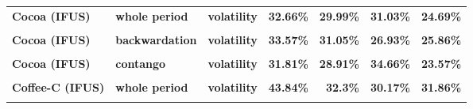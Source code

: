 \documentclass[
  authoryear,
  preprint,
  3p]{elsarticle}
\begin{document}
\begin{longtable}[t]{>{}l>{}l>{}l>{}r>{}r>{}r>{}r}
\addlinespace
\textbf{Cocoa (IFUS)} & \textbf{whole period} & \textbf{volatility} & \textcolor[HTML]{4285f4}{\textbf{32.66\%}} & \textcolor[HTML]{4285f4}{\textbf{29.99\%}} & \textcolor[HTML]{4285f4}{\textbf{31.03\%}} & \textcolor[HTML]{4285f4}{\textbf{24.69\%}}\\
\textbf{\cellcolor{gray!10}{Cocoa (IFUS)}} & \textbf{\cellcolor{gray!10}{backwardation}} & \textbf{\cellcolor{gray!10}{mean}} & \textcolor[HTML]{4285f4}{\textbf{\cellcolor{gray!10}{4.12\%}}} & \textcolor[HTML]{4285f4}{\textbf{\cellcolor{gray!10}{9.25\%}}} & \textcolor[HTML]{4285f4}{\textbf{\cellcolor{gray!10}{-9.56\%}}} & \textcolor[HTML]{4285f4}{\textbf{\cellcolor{gray!10}{-2.98\%}}}\\
\textbf{Cocoa (IFUS)} & \textbf{backwardation} & \textbf{volatility} & \textcolor[HTML]{4285f4}{\textbf{33.57\%}} & \textcolor[HTML]{4285f4}{\textbf{31.05\%}} & \textcolor[HTML]{4285f4}{\textbf{26.93\%}} & \textcolor[HTML]{4285f4}{\textbf{25.86\%}}\\
\textbf{\cellcolor{gray!10}{Cocoa (IFUS)}} & \textbf{\cellcolor{gray!10}{contango}} & \textbf{\cellcolor{gray!10}{mean}} & \textcolor[HTML]{4285f4}{\textbf{\cellcolor{gray!10}{3.67\%}}} & \textcolor[HTML]{4285f4}{\textbf{\cellcolor{gray!10}{23.43\%}}} & \textcolor[HTML]{4285f4}{\textbf{\cellcolor{gray!10}{12.92\%}}} & \textcolor[HTML]{4285f4}{\textbf{\cellcolor{gray!10}{10.29\%}}}\\
\textbf{Cocoa (IFUS)} & \textbf{contango} & \textbf{volatility} & \textcolor[HTML]{4285f4}{\textbf{31.81\%}} & \textcolor[HTML]{4285f4}{\textbf{28.91\%}} & \textcolor[HTML]{4285f4}{\textbf{34.66\%}} & \textcolor[HTML]{4285f4}{\textbf{23.57\%}}\\
\addlinespace
\textbf{\cellcolor{gray!10}{Coffee-C (IFUS)}} & \textbf{\cellcolor{gray!10}{whole period}} & \textbf{\cellcolor{gray!10}{mean}} & \textcolor[HTML]{4285f4}{\textbf{\cellcolor{gray!10}{-5.91\%}}} & \textcolor[HTML]{4285f4}{\textbf{\cellcolor{gray!10}{20.38\%}}} & \textcolor[HTML]{4285f4}{\textbf{\cellcolor{gray!10}{2.2\%}}} & \textcolor[HTML]{4285f4}{\textbf{\cellcolor{gray!10}{1.99\%}}}\\
\textbf{Coffee-C (IFUS)} & \textbf{whole period} & \textbf{volatility} & \textcolor[HTML]{4285f4}{\textbf{43.84\%}} & \textcolor[HTML]{4285f4}{\textbf{32.3\%}} & \textcolor[HTML]{4285f4}{\textbf{30.17\%}} & \textcolor[HTML]{4285f4}{\textbf{31.86\%}}\\
\textbf{\cellcolor{gray!10}{Coffee-C (IFUS)}} & \textbf{\cellcolor{gray!10}{backwardation}} & \textbf{\cellcolor{gray!10}{mean}} & \textcolor[HTML]{4285f4}{\textbf{\cellcolor{gray!10}{4.51\%}}} & \textcolor[HTML]{4285f4}{\textbf{\cellcolor{gray!10}{26.49\%}}} & \textcolor[HTML]{4285f4}{\textbf{\cellcolor{gray!10}{2.66\%}}} & \textcolor[HTML]{4285f4}{\textbf{\cellcolor{gray!10}{14.36\%}}}\\

\end{longtable}
\end{document}

